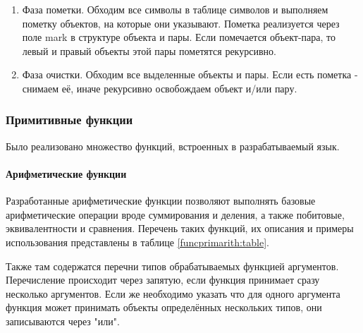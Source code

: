 \begin{enumerate}
	\item Фаза пометки.
	Обходим все символы в таблице символов и выполняем пометку объектов, на которые они указывают. Пометка реализуется через поле mark в структуре объекта и пары. Если помечается объект-пара, то левый и правый объекты этой пары пометятся рекурсивно.
	
	\item Фаза очистки.
	Обходим все выделенные объекты и пары. Если есть пометка - снимаем её, иначе рекурсивно освобождаем объект и/или пару.
	
\end{enumerate}

\subsubsection{Примитивные функции}

Было реализовано множество функций, встроенных в разрабатываемый язык.

\paragraph{Арифметические функции}

Разработанные арифметические функции позволяют выполнять базовые арифметические операции вроде суммирования и деления, а также побитовые, эквивалентности и сравнения. Перечень таких функций, их описания и примеры использования представлены в таблице \ref{funcprimarith:table}.

Также там содержатся перечни типов обрабатываемых функцией аргументов. Перечисление происходит через запятую, если функция принимает сразу несколько аргументов. Если же необходимо указать что для одного аргумента функция может принимать объекты определённых нескольких типов, они записываются через "или".

